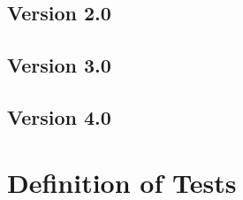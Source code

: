 \documentclass{article}
\begin{document}
\subsection{Version 2.0}

\subsection{Version 3.0}

\subsection{Version 4.0}

\section{Definition of Tests}
\end{document}
